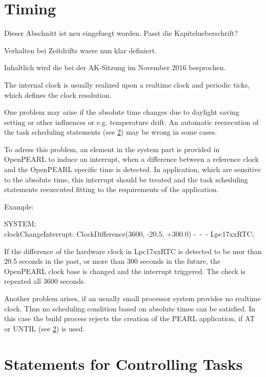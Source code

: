 \section{Timing}

\begin{discuss}
Dieser Abschnitt ist neu eingefuegt worden.
Passt die Kapitelueberschrift?

Verhalten bei Zeitdrifts waere nun klar definiert.

Inhaltlich wird die bei der AK-Sitzung im November 2016 besprochen.

\begin{added}
The internal clock is usually realized upon a realtime clock and 
periodic ticks, which defines the clock resolution. 

One problem may arise if the absolute time changes due to 
daylight saving setting or other influences or e.g. temperature  drift.
An automatic reexecution of the task scheduling statements
 (see \ref{sec_tasking_statements})
may be wrong in some cases. 

To adress this problem, 
an element in the system part is provided in OpenPEARL
to induce an interrupt, when a difference between a reference clock and
the OpenPEARL specific time is detected. In application, which are sensitive
to the absolute time, this  interrupt should be treated and the task scheduling
statements reexecuted fitting to the requirements of the application.

Example:

SYSTEM;\\
\x clockChangeInterrupt: ClockDifference(3600, -20.5, +300.0) -\ -\ - Lpc17xxRTC;

If the difference of the hardware clock in Lpc17xxRTC is detected to be 
mor than 20.5 seconds in the past, or more than 300 seconds in the future,
the OpenPEARL clock base is changed and the interrupt triggered.
The check is repeated all 3600 seconds.

Another problem arises, if an usually small processor system provides no
realtime clock. Thus no scheduling condition based on absolute times 
 can be satisfied. In this case the build process rejects the creation
of the PEARL application, if AT or UNTIL
 (see \ref{sec_tasking_statements})
 is used.

\end{added}
\end{discuss}


\section{Statements for Controlling Tasks}    %
\label{sec_tasking_statements}


